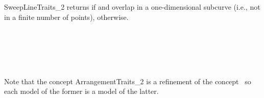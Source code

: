 \begin{ccRefConcept}{SweepLineTraits_2}
  {returns  if  and  overlap in a one-dimensional
  subcurve (i.e., not in a finite number of points),  otherwise.}

\ccHasModels
  \\
  \\
  \\
   \\

  Note that the concept ArrangementTraits\_2 is a refinement of the 
  concept \ccRefName\ so each model of the former is a model of the latter.

\ccSeeAlso







\end{ccRefConcept}


